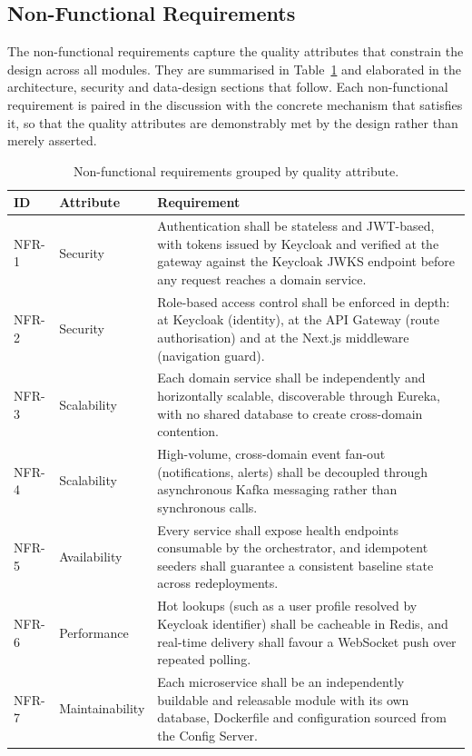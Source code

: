 \subsection{Non-Functional Requirements}
\label{sec:nfr}

The non-functional requirements capture the quality attributes that constrain the
design across all modules. They are summarised in Table~\ref{tab:nfr} and elaborated
in the architecture, security and data-design sections that follow. Each
non-functional requirement is paired in the discussion with the concrete mechanism
that satisfies it, so that the quality attributes are demonstrably met by the design
rather than merely asserted.

\begin{table}[htbp]
\centering
\caption{Non-functional requirements grouped by quality attribute.}
\label{tab:nfr}
\renewcommand{\arraystretch}{1.25}
\begin{tabular}{|p{}|p{}|p{}|}
\hline
\textbf{ID} & \textbf{Attribute} & \textbf{Requirement} \\
\hline
NFR-1 & Security & Authentication shall be stateless and JWT-based, with tokens issued by Keycloak and verified at the gateway against the Keycloak JWKS endpoint before any request reaches a domain service. \\
\hline
NFR-2 & Security & Role-based access control shall be enforced in depth: at Keycloak (identity), at the API Gateway (route authorisation) and at the Next.js middleware (navigation guard). \\
\hline
NFR-3 & Scalability & Each domain service shall be independently and horizontally scalable, discoverable through Eureka, with no shared database to create cross-domain contention. \\
\hline
NFR-4 & Scalability & High-volume, cross-domain event fan-out (notifications, alerts) shall be decoupled through asynchronous Kafka messaging rather than synchronous calls. \\
\hline
NFR-5 & Availability & Every service shall expose health endpoints consumable by the orchestrator, and idempotent seeders shall guarantee a consistent baseline state across redeployments. \\
\hline
NFR-6 & Performance & Hot lookups (such as a user profile resolved by Keycloak identifier) shall be cacheable in Redis, and real-time delivery shall favour a WebSocket push over repeated polling. \\
\hline
NFR-7 & Maintainability & Each microservice shall be an independently buildable and releasable module with its own database, Dockerfile and configuration sourced from the Config Server. \\

\end{tabular}
\end{table}
